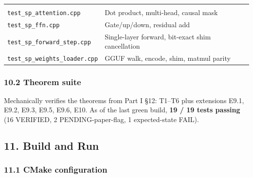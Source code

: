 \documentclass[
  11pt,
]{article}
\begin{document}
\begin{longtable}[]{@{}ll@{}}
\begin{minipage}[t]{0.68\columnwidth}
\end{minipage}\tabularnewline
\begin{minipage}[t]{0.26\columnwidth}\raggedright
\texttt{test\_sp\_attention.cpp}\strut
\end{minipage} & \begin{minipage}[t]{0.68\columnwidth}\raggedright
Dot product, multi-head, causal mask\strut
\end{minipage}\tabularnewline
\begin{minipage}[t]{0.26\columnwidth}\raggedright
\texttt{test\_sp\_ffn.cpp}\strut
\end{minipage} & \begin{minipage}[t]{0.68\columnwidth}\raggedright
Gate/up/down, residual add\strut
\end{minipage}\tabularnewline
\begin{minipage}[t]{0.26\columnwidth}\raggedright
\texttt{test\_sp\_forward\_step.cpp}\strut
\end{minipage} & \begin{minipage}[t]{0.68\columnwidth}\raggedright
Single-layer forward, bit-exact shim cancellation\strut
\end{minipage}\tabularnewline
\begin{minipage}[t]{0.26\columnwidth}\raggedright
\texttt{test\_sp\_weights\_loader.cpp}\strut
\end{minipage} & \begin{minipage}[t]{0.68\columnwidth}\raggedright
GGUF walk, encode, shim, matmul parity\strut
\end{minipage}\tabularnewline
\bottomrule
\end{longtable}

\hypertarget{theorem-suite}{%
\subsubsection{10.2 Theorem suite}\label{theorem-suite}}

Mechanically verifies the theorems from Part I §12: T1--T6 plus
extensions E9.1, E9.2, E9.3, E9.5, E9.6, E10. As of the last green
build, \textbf{19 / 19 tests passing} (16 VERIFIED, 2
PENDING-paper-flag, 1 expected-state FAIL).

\hypertarget{build-and-run}{%
\subsection{11. Build and Run}\label{build-and-run}}

\hypertarget{cmake-configuration}{%
\subsubsection{11.1 CMake configuration}\label{cmake-configuration}}
\end{document}
